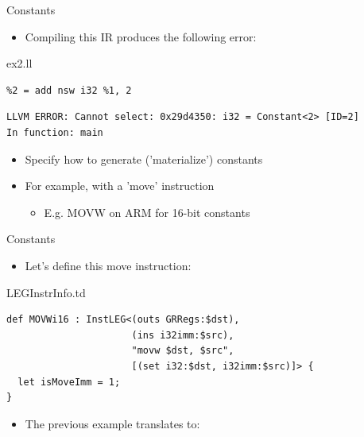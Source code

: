 \begin{frame}[fragile]{Constants}

\begin{itemize}
    \item Compiling this IR produces the following error:
\end{itemize}

\begin{block}{ex2.ll}
\begin{lstlisting}
%2 = add nsw i32 %1, 2
\end{lstlisting}
\end{block}

\begin{block}{}
\begin{lstlisting}
LLVM ERROR: Cannot select: 0x29d4350: i32 = Constant<2> [ID=2]
In function: main
\end{lstlisting}
\end{block}

\begin{itemize}
    \item Specify how to generate ('materialize') constants
    \item For example, with a 'move' instruction
    \begin{itemize}
        \item E.g. MOVW on ARM for 16-bit constants
    \end{itemize}
\end{itemize}

\end{frame}


\begin{frame}[fragile]{Constants}

\begin{itemize}
    \item Let's define this move instruction:
\end{itemize}

\begin{block}{LEGInstrInfo.td}
\begin{lstlisting}
def MOVWi16 : InstLEG<(outs GRRegs:$dst),
                      (ins i32imm:$src),
                      "movw $dst, $src",
                      [(set i32:$dst, i32imm:$src)]> {
  let isMoveImm = 1;
}
\end{lstlisting}
\end{block}

\begin{itemize}
    \item The previous example translates to:
\end{itemize}


\end{frame}

